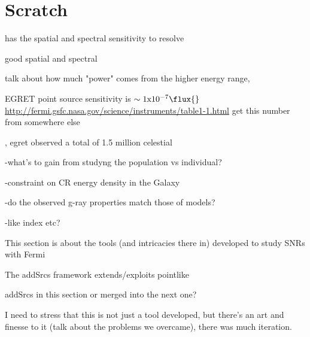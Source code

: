 \section{Scratch}
has the spatial and spectral sensitivity to resolve

good spatial and spectral 


talk about how much "power" comes from the higher energy  range,

EGRET point source sensitivity is ${\rm \sim1x10^{-7}}\flux{}$
 \url{http://fermi.gsfc.nasa.gov/science/instruments/table1-1.html} get this number from somewhere else



\cite{Thomson93}, egret observed a total of 1.5 million celestial \gam{}




-what's to gain from studyng the population vs individual?

-constraint on CR energy density in the Galaxy

-do the observed g-ray properties match those
of models?

-like index etc?


This section is about the tools (and intricacies there in) developed to study SNRs with Fermi

The addSrcs framework extends/exploits pointlike 

addSrcs in this section or merged into the next one?

I need to stress that this is not just a tool developed, but there's an art and finesse to it (talk about the problems we overcame), there was much iteration.

